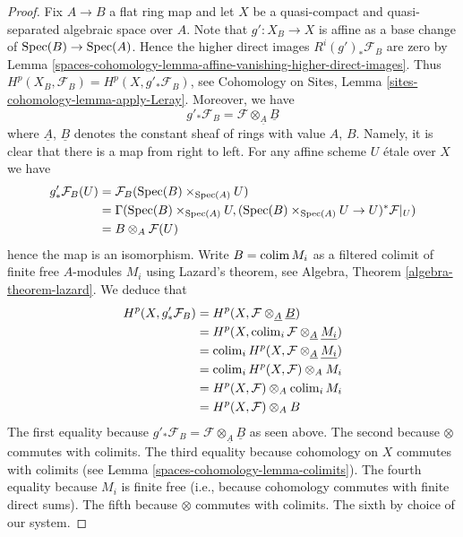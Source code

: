 \begin{proof}
\medskip\noindent
Fix $A \to B$ a flat ring map and let $X$ be a quasi-compact and
quasi-separated algebraic space over $A$. Note that $g' : X_B \to X$
is affine as a base change of $\operatorname{Spec}(B) \to \operatorname{Spec}(A)$. Hence
the higher direct images $R^i(g')_*\mathcal{F}_B$ are zero by
Lemma \ref{spaces-cohomology-lemma-affine-vanishing-higher-direct-images}.
Thus $H^p(X_B, \mathcal{F}_B) = H^p(X, g'_*\mathcal{F}_B)$, see
Cohomology on Sites, Lemma \ref{sites-cohomology-lemma-apply-Leray}.
Moreover, we have
$$
g'_*\mathcal{F}_B = \mathcal{F} \otimes_{\underline{A}} \underline{B}
$$
where $\underline{A}$, $\underline{B}$ denotes the constant sheaf of
rings with value $A$, $B$. Namely, it is clear that there is a map
from right to left. For any affine scheme $U$ \'etale over $X$ we have
\begin{align*}
g'_*\mathcal{F}_B(U) & = \mathcal{F}_B(\operatorname{Spec}(B) \times_{\operatorname{Spec}(A)} U) \\
& =
\Gamma(\operatorname{Spec}(B) \times_{\operatorname{Spec}(A)} U,
(\operatorname{Spec}(B) \times_{\operatorname{Spec}(A)} U \to U)^*\mathcal{F}|_U) \\
& =
B \otimes_A \mathcal{F}(U)
\end{align*}
hence the map is an isomorphism. Write $B = \operatorname{colim} M_i$ as a filtered
colimit of finite free $A$-modules $M_i$ using Lazard's theorem, see
Algebra, Theorem \ref{algebra-theorem-lazard}.
We deduce that
\begin{align*}
H^p(X, g'_*\mathcal{F}_B) &
= H^p(X, \mathcal{F} \otimes_{\underline{A}} \underline{B}) \\
& = H^p(X, \operatorname{colim}_i \mathcal{F} \otimes_{\underline{A}} \underline{M_i}) \\
& = \operatorname{colim}_i H^p(X, \mathcal{F} \otimes_{\underline{A}} \underline{M_i}) \\
& = \operatorname{colim}_i H^p(X, \mathcal{F}) \otimes_A M_i \\
& = H^p(X, \mathcal{F}) \otimes_A \operatorname{colim}_i M_i \\
& = H^p(X, \mathcal{F}) \otimes_A B
\end{align*}
The first equality because
$g'_*\mathcal{F}_B = \mathcal{F} \otimes_{\underline{A}} \underline{B}$
as seen above.
The second because $\otimes$ commutes with colimits.
The third equality because cohomology on $X$ commutes with
colimits (see
Lemma \ref{spaces-cohomology-lemma-colimits}).
The fourth equality because $M_i$ is finite free (i.e., because cohomology
commutes with finite direct sums).
The fifth because $\otimes$ commutes with colimits.
The sixth by choice of our system.
\end{proof}

